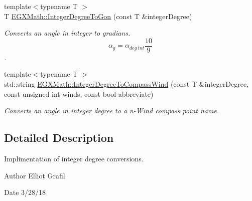 \begin{DoxyCompactItemize}
{\footnotesize template$<$typename T $>$ }\\T \mbox{\hyperlink{group___e_g_x_math-_conversions-_angle_conversions-_integer_degree_ga6e5be425c37ad27319f09329156c64bb}{E\+G\+X\+Math\+::\+Integer\+Degree\+To\+Gon}} (const T \&integer\+Degree)
\begin{DoxyCompactList}\small\item\em Converts an angle in integer to gradians. \[\alpha_{g}=\alpha_{deg\ int}\frac{10}{9}\]. \end{DoxyCompactList}\item 
{\footnotesize template$<$typename T $>$ }\\std\+::string \mbox{\hyperlink{group___e_g_x_math-_conversions-_angle_conversions-_integer_degree_ga01abeefd29282a3c88d3d3c28fd2c6fa}{E\+G\+X\+Math\+::\+Integer\+Degree\+To\+Compass\+Wind}} (const T \&integer\+Degree, const unsigned int winds, const bool abbreviate)
\begin{DoxyCompactList}\small\item\em Converts an angle in integer degree to a n-\/\+Wind compass point name. \end{DoxyCompactList}\end{DoxyCompactItemize}


\subsection{Detailed Description}
Implimentation of integer degree conversions. 

\begin{DoxyAuthor}{Author}
Elliot Grafil 
\end{DoxyAuthor}
\begin{DoxyDate}{Date}
3/28/18 
\end{DoxyDate}
